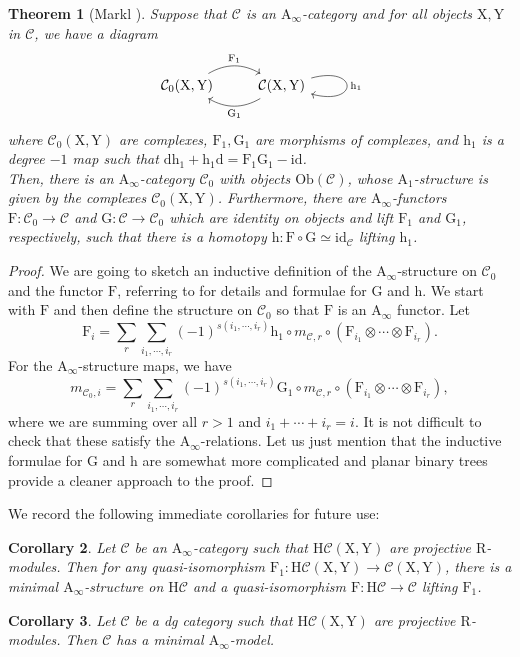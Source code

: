 \documentclass{article}
\theoremstyle{plain}
\newtheorem{theorem}{Theorem}[subsection]   %
\newtheorem{corollary}[theorem]{Corollary}
\theoremstyle{definition}
\theoremstyle{remark}
\newcommand{\mr}{\mathrm}
\newcommand{\Aa}{\mr{A}_{\infty}}
\newcommand{\Cc}{\mathcal C}
\newcommand{\3}{\vspace{3mm}}
\newcommand{\2}{\vspace{2mm}}
\newcommand{\1}{\vspace{1mm}}
\begin{document}
\begin{theorem}[Markl \cite{MR2287133}]
Suppose that $\mathcal{C}$ is an $\Aa$-category and for all objects $\mr{X,Y}$ in $\mathcal{C}$, we have a diagram
\[
\begin{tikzcd}
\mathcal{C}_0(\mr{X,Y}) \arrow[r, bend left, "\mr{F}_1"] & \mathcal{C}(\mr{X,Y}) \arrow[l, bend left, "\mr{G}_1"] \arrow[loop right, "\mr{h}_1"]
\end{tikzcd}
\]
where $\mathcal{C}_0(\mr{X,Y})$ are complexes, $\mr{F_1,G_1}$ are morphisms of complexes, and $\mr{h}_1$ is a degree $-1$ map such that $\mr{dh_1+h_1d}=\mr{F_1G_1}-\mr{id}$.\\
Then, there is an $\Aa$-category $\mathcal{C}_0$ with objects $\mr{Ob}(\mathcal{C})$, whose $\mr{A}_1$-structure is given by the complexes $\mathcal{C}_0(\mr{X,Y})$. Furthermore, there are $\Aa$-functors $\mr{F}:\mathcal{C}_0\to \mathcal{C}$ and $\mr{G}:\mathcal{C}\to \mathcal{C}_0$ which are identity on objects and lift $\mr{F}_1$ and $\mr{G}_1$, respectively, such that there is a homotopy $\mr{h}: \mr{F}\circ\mr{G}\simeq \mr{id}_\mathcal{C}$ lifting $\mr{h}_1$.
\end{theorem}
\begin{proof}
We are going to sketch an inductive definition of the $\Aa$-structure on $\Cc_0$ and the functor $\mr{F}$, referring to \cite{MR2287133} for details and formulae for $\mr{G}$ and $\mr{h}$. We start with $\mr{F}$ and then define the structure on $\Cc_0$ so that $\mr{F}$ is an $\Aa$ functor. Let $$\mr{F}_i=\sum_r\sum_{i_1,\cdots,i_r} (-1)^{s(i_1,\cdots,i_r)}\mr{h}_1\circ m_{\Cc,r}\circ \left(\mr{F}_{i_1}\otimes\cdots\otimes \mr{F}_{i_r}\right).$$ For the $\Aa$-structure maps, we have $$m_{\Cc_0,i}=\sum_r\sum_{i_1,\cdots,i_r} (-1)^{s(i_1,\cdots,i_r)}\mr{G}_1\circ m_{\Cc,r}\circ \left(\mr{F}_{i_1}\otimes\cdots\otimes \mr{F}_{i_r}\right),$$ where we are summing over all $r>1$ and $i_1+\cdots+i_r=i$. It is not difficult to check that these satisfy the $\Aa$-relations. Let us just mention that the inductive formulae for $\mr{G}$ and $\mr{h}$ are somewhat more complicated and planar binary trees provide a cleaner approach to the proof.
\end{proof}
We record the following immediate corollaries for future use:
\2
\begin{corollary}
Let $\mathcal{C}$ be an $\Aa$-category such that $\mr{H}\mathcal{C}(\mr{X,Y})$ are projective $\mr{R}$-modules. Then for any quasi-isomorphism $\mr{F}_1:\mr{H}\mathcal{C}(\mr{X,Y}) \to \mathcal{C}(\mr{X,Y})$, there is a minimal $\Aa$-structure on $\mr{H}\mathcal{C}$ and a quasi-isomorphism $\mr{F}:\mr{H}\mathcal{C}\to \mathcal{C}$ lifting $\mr{F}_1$.
\end{corollary}
\2
\begin{corollary}
Let $\mathcal{C}$ be a dg category such that $\mr{H}\mathcal{C}(\mr{X,Y})$ are projective $\mr{R}$-modules. Then $\mathcal{C}$ has a minimal $\Aa$-model.
\end{corollary}
\end{document}
